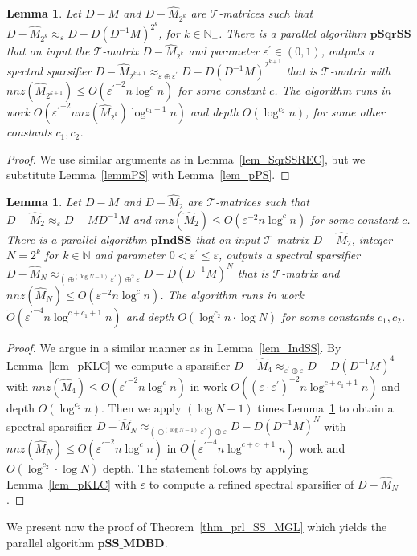 \documentclass[11pt]{article}
\newcommand{\GL}{\mathcal{T}}
\newcommand{\pSqrSS}{\mathrm{\mathbf{pSqrSS}}}
\newcommand{\pIndSS}{\mathrm{\mathbf{pIndSS}}}
\newcommand{\pSSMDBD}{\mathrm{\mathbf{pSS\_MDBD}}}
\newcommand{\wO}{\widetilde{O}}
\newcommand{\hM}{\widehat{M}}
\newcommand{\Di}{D^{-1}}
\newcommand{\prm}{\prime}
\newcommand{\N}{\mathbb{N}}
\newcommand{\eps}{\epsilon}
\renewcommand{\leq}{\leqslant}
\newcommand{\lemref}[1]{Lemma~\ref{lem:#1}}
\renewcommand{\eps}{\varepsilon}
\newcommand{\mylemma}[2]{\begin{lem}\label{lem:#1}#2\end{lem}}
\newtheorem{lem}[thm]{Lemma}
\numberwithin{thm}{section}
\begin{document}
\newcommand{\lempSqrSSREC}
{
Let $D-M$ and $D-\hM_{2^{k}}$
are $\GL$-matrices such that $D-\hM_{2^{k}}\approx_{\eps}D-D(\Di M)^{2^{k}}$, for $k\in\N_+$. There is a parallel algorithm $\pSqrSS$
that on input the $\GL$-matrix $D-\hM_{2^{k}}$
and parameter $\eps^{\prm}\in(0,1)$, outputs a spectral sparsifier $D-\hM_{2^{k+1}}\approx_{\eps\oplus\eps^{\prm}}D-D(\Di M)^{2^{k+1}}$ that is $\GL$-matrix with $nnz(\hM_{2^{k+1}})\leq O({\eps^{\prm}}^{-2}n\log^{c} n)$ for some constant $c$. The algorithm runs in work $O({\eps^{\prm}}^{-2}nnz(\hM_{2^{k}})\log^{c_1+1}n)$ and depth $O(\log^{c_2}n)$, for some other constants $c_1,c_2$.
}
\mylemma{lempSqrSSREC}{\lempSqrSSREC}

\begin{proof}
We use similar arguments as in Lemma~\ref{lem_SqrSSREC}, but we substitute Lemma~\ref{lemmPS} with Lemma~\ref{lem_pPS}.
\end{proof}

\newcommand{\lempIndSS}
{
Let $D-M$ and $D-\hM_2$
are $\GL$-matrices such that $D-\hM_2\approx_{\eps}D-M\Di M$ and $nnz(\hM_2)\leq O(\eps^{-2}n\log^{c} n)$ for some constant $c$. There is a parallel algorithm $\pIndSS$ that on input $\GL$-matrix $D-\hM_2$, integer $N=2^k$ for $k\in\N$ and parameter $0<\eps^{\prm}\leq\eps$, outputs a spectral sparsifier $D-\hM_N\approx_{(\oplus^{(\log N - 1)}\eps^{\prm})\oplus^{2}\eps}D-D(\Di M)^N$ that is $\GL$-matrix and $nnz(\hM_N)\leq O(\eps^{-2}n\log^{c}n)$. The algorithm runs in work $\wO({\eps^{\prm}}^{-4}n\log^{c+c_1+1}n)$ and depth $O(\log^{c_2}n\cdot\log N)$ for some constants $c_1,c_2$.
}
\mylemma{lempIndSS}{\lempIndSS}

\begin{proof}
We argue in a similar manner as in Lemma~\ref{lem_IndSS}. By Lemma~\ref{lem_pKLC} we compute a sparsifier $D-\hM_4\approx_{\eps^{\prm}\oplus\eps}D-D(\Di M)^4$ with $nnz(\hM_4)\leq O({\eps^{\prm}}^{-2}n\log^{c}n)$ in work $O((\eps\cdot\eps^{\prm})^{-2}n\log^{c+c_1+1}n)$ and depth $O(\log^{c_2}n)$. Then we apply $(\log N - 1)$ times \lemref{lempSqrSSREC} to obtain a spectral sparsifier $D-\hM_N\approx_{(\oplus^{(\log N - 1)}\eps^{\prm})\oplus\eps}D-D(\Di M)^N$ with $nnz(\hM_N)\leq O({\eps^{\prm}}^{-2}n\log^{c} n)$ in $O({\eps^{\prm}}^{-4}n\log^{c+c_1+1}n)$ work and $O(\log^{c_2}\cdot\log N)$ depth. The statement follows by applying Lemma~\ref{lem_pKLC} with $\eps$ to compute a refined spectral sparsifier of $D-\hM_N$.
\end{proof}

We present now the proof of Theorem~\ref{thm_prl_SS_MGL} which yields the parallel algorithm $\pSSMDBD$.
\end{document}
